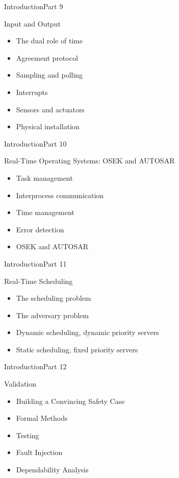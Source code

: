 \begin{frame}{Introduction}{Part 9}
    \begin{block}{Input and Output}
\begin{itemize}
\item
  The dual role of time
\item
  Agreement protocol
\item
  Sampling and polling
\item
  Interrupts
\item
  Sensors and actuators
\item
  Physical installation
\end{itemize}
\end{block}
\end{frame}


\begin{frame}{Introduction}{Part 10}
    \begin{block}{Real-Time Operating Systems: OSEK and AUTOSAR}
\begin{itemize}
\item
  Task management
\item
  Interprocess communication
\item
  Time management
\item
  Error detection
\item
  OSEK and AUTOSAR
\end{itemize}
\end{block}
\end{frame}


\begin{frame}{Introduction}{Part 11}
    \begin{block}{Real-Time Scheduling}
\begin{itemize}
\item
  The scheduling problem
\item
  The adversary problem
\item
  Dynamic scheduling, dynamic priority servers
\item
  Static scheduling, fixed priority servers
\end{itemize}
\end{block}
\end{frame}


\begin{frame}{Introduction}{Part 12}
    \begin{block}{Validation}
\begin{itemize}
\item
  Building a Convincing Safety Case
\item
  Formal Methods
\item
  Testing
\item
  Fault Injection
\item
  Dependability Analysis
\end{itemize}
\end{block}
\end{frame}
